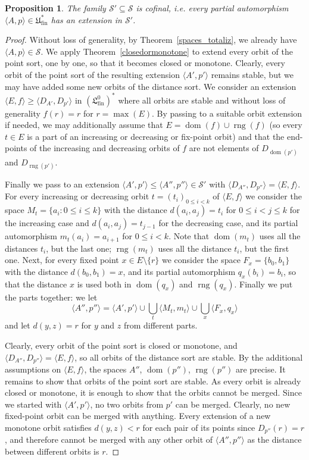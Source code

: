 \documentclass[10pt,a4paper]{article}
\newtheorem{prop}[tw]{Proposition}
\theoremstyle{definition}
\theoremstyle{remark}
\newcommand \set [1]{\{#1\}}
\newcommand \seq [1]{\langle #1 \rangle}
\newcommand \dom {\operatorname{dom}}
\newcommand \rng {\operatorname{rng}}
\newcommand \Su {\mathscr{S}}
\newcommand \fin {{\operatorname{fin}}}
\newcommand \Lin {\mathfrak{L}}
\newcommand \Ult {\mathfrak{U}}
\begin{document}
\begin{prop} \label{thm:sufficient_cofinal}
    The family $\Su' \subseteq \Su$ is cofinal, i.e. every partial automorphism $\seq{A, p} \in \Ult^*_\fin$ has an extension in $\Su'$.
\end{prop}
\begin{proof}
    Without loss of generality, by Theorem~\ref{spaces_totaliz}, we already have $\seq{A, p} \in \Su$.
    We apply Theorem~\ref{closedormonotone} to extend every orbit of the point sort, one by one, so that it becomes closed or monotone.
    Clearly, every orbit of the point sort of the resulting extension $\seq{A', p'}$ remains stable, but we may have added some new orbits of the distance sort.
    We consider an extension $\seq{E, f} \geq \seq{D_{A'}, D_{p'}}$ in $(\Lin^0_\fin)^*$ where all orbits are stable and without loss of generality $f(r) = r$ for $r = \max(E)$.
    By passing to a suitable orbit extension if needed, we may additionally assume that $E = \dom(f) \cup \rng(f)$ (so every $t \in E$ is a part of an increasing or decreasing or fix-point orbit) and that the end-points of the increasing and decreasing orbits of $f$ are not elements of $D_{\dom(p')}$ and $D_{\rng(p')}$.

    Finally we pass to an extension $\seq{A', p'} \leq \seq{A'', p''} \in \Su'$ with $\seq{D_{A''}, D_{p''}} = \seq{E, f}$.
    For every increasing or decreasing orbit $t = (t_i)_{0 \leq i < k}$ of $\seq{E, f}$ we consider the space $M_t = \set{a_i: 0 \leq i \leq k}$ with the distance $d(a_i, a_j) = t_i$ for $0 \leq i < j \leq k$ for the increasing case and $d(a_i, a_j) = t_{j - 1}$ for the decreasing case, and its partial automorphism $m_t(a_i) = a_{i + 1}$ for $0 \leq i < k$.
    Note that $\dom(m_t)$ uses all the distances $t_i$, but the last one; $\rng(m_t)$ uses all the distance $t_i$, but the first one.
    Next, for every fixed point $x \in E \setminus \set{r}$ we consider the space $F_x = \set{b_0, b_1}$ with the distance $d(b_0, b_1) = x$, and its partial automorphism $q_x(b_i) = b_i$, so that the distance $x$ is used both in $\dom(q_x)$ and $\rng(q_x)$.
    Finally we put the parts together: we let 
    \[\textstyle
        \seq{A'', p''} = \seq{A', p'} \cup \bigcup_t \seq{M_t, m_t} \cup \bigcup_x \seq{F_x, q_x}
    \]
    and let $d(y, z) = r$ for $y$ and $z$  from different parts.

    Clearly, every orbit of the point sort is closed or monotone, and $\seq{D_{A''}, D_{p''}} = \seq{E, f}$, so all orbits of the distance sort are stable.
    By the additional assumptions on $\seq{E, f}$, the spaces $A''$, $\dom(p'')$, $\rng(p'')$ are precise.
    It remains to show that orbits of the point sort are stable.
    As every orbit is already closed or monotone, it is enough to show that the orbits cannot be merged.
    Since we started with $\seq{A', p'}$, no two orbits from $p'$ can be merged.
    Clearly, no new fixed-point orbit can be merged with anything.
    Every extension of a new monotone orbit satisfies $d(y, z) < r$ for each pair of its points since $D_{p''}(r) = r$, and therefore cannot be merged with any other orbit of $\seq{A'', p''}$ as the distance between different orbits is $r$.
\end{proof}
\end{document}
